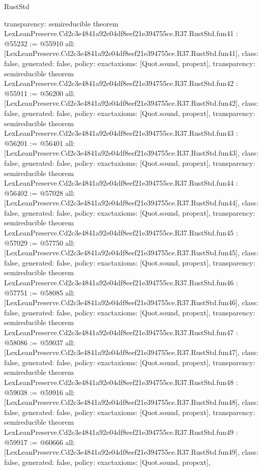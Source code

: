 \begin{lexlean}{RustStd}
\begin{coremodule}
{  transparency: semireducible
}
theorem LexLeanPreserve.Cd2c3e4841a92e04df8eef21e394755ce.R37.RustStd.fun41 : @55232 := @55910 {
  all: [LexLeanPreserve.Cd2c3e4841a92e04df8eef21e394755ce.R37.RustStd.fun41],
  class: false,
  generated: false,
  policy: exact{axioms: [Quot.sound, propext]},
  transparency: semireducible
}
theorem LexLeanPreserve.Cd2c3e4841a92e04df8eef21e394755ce.R37.RustStd.fun42 : @55911 := @56200 {
  all: [LexLeanPreserve.Cd2c3e4841a92e04df8eef21e394755ce.R37.RustStd.fun42],
  class: false,
  generated: false,
  policy: exact{axioms: [Quot.sound, propext]},
  transparency: semireducible
}
theorem LexLeanPreserve.Cd2c3e4841a92e04df8eef21e394755ce.R37.RustStd.fun43 : @56201 := @56401 {
  all: [LexLeanPreserve.Cd2c3e4841a92e04df8eef21e394755ce.R37.RustStd.fun43],
  class: false,
  generated: false,
  policy: exact{axioms: [Quot.sound, propext]},
  transparency: semireducible
}
theorem LexLeanPreserve.Cd2c3e4841a92e04df8eef21e394755ce.R37.RustStd.fun44 : @56402 := @57028 {
  all: [LexLeanPreserve.Cd2c3e4841a92e04df8eef21e394755ce.R37.RustStd.fun44],
  class: false,
  generated: false,
  policy: exact{axioms: [Quot.sound, propext]},
  transparency: semireducible
}
theorem LexLeanPreserve.Cd2c3e4841a92e04df8eef21e394755ce.R37.RustStd.fun45 : @57029 := @57750 {
  all: [LexLeanPreserve.Cd2c3e4841a92e04df8eef21e394755ce.R37.RustStd.fun45],
  class: false,
  generated: false,
  policy: exact{axioms: [Quot.sound, propext]},
  transparency: semireducible
}
theorem LexLeanPreserve.Cd2c3e4841a92e04df8eef21e394755ce.R37.RustStd.fun46 : @57751 := @58085 {
  all: [LexLeanPreserve.Cd2c3e4841a92e04df8eef21e394755ce.R37.RustStd.fun46],
  class: false,
  generated: false,
  policy: exact{axioms: [Quot.sound, propext]},
  transparency: semireducible
}
theorem LexLeanPreserve.Cd2c3e4841a92e04df8eef21e394755ce.R37.RustStd.fun47 : @58086 := @59037 {
  all: [LexLeanPreserve.Cd2c3e4841a92e04df8eef21e394755ce.R37.RustStd.fun47],
  class: false,
  generated: false,
  policy: exact{axioms: [Quot.sound, propext]},
  transparency: semireducible
}
theorem LexLeanPreserve.Cd2c3e4841a92e04df8eef21e394755ce.R37.RustStd.fun48 : @59038 := @59916 {
  all: [LexLeanPreserve.Cd2c3e4841a92e04df8eef21e394755ce.R37.RustStd.fun48],
  class: false,
  generated: false,
  policy: exact{axioms: [Quot.sound, propext]},
  transparency: semireducible
}
theorem LexLeanPreserve.Cd2c3e4841a92e04df8eef21e394755ce.R37.RustStd.fun49 : @59917 := @60666 {
  all: [LexLeanPreserve.Cd2c3e4841a92e04df8eef21e394755ce.R37.RustStd.fun49],
  class: false,
  generated: false,
  policy: exact{axioms: [Quot.sound, propext]},
}
\end{coremodule}
\end{lexlean}
